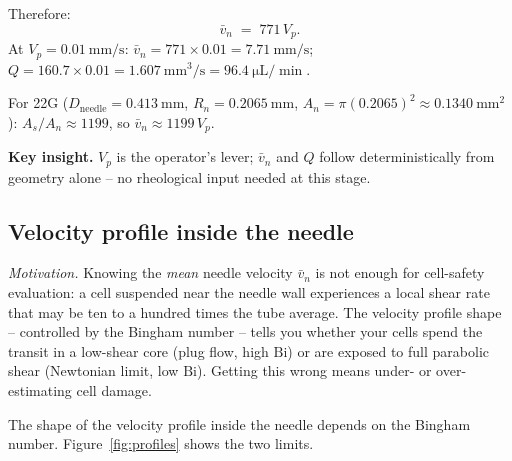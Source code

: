 \documentclass[11pt,a4paper]{article}
\newcommand{\Bi}{\mathrm{Bi}}
\begin{document}
\begin{derivationbox}[title={DERIVATION --- Mass balance: $V_p\to Q\to\bar v_n$}]
Therefore:
\begin{equation}
\bar v_n \;=\; 771\,V_p.
\label{eq:vbar_21G}
\end{equation}
At $V_p=\SI{0.01}{\mm/\s}$: $\bar v_n = 771\times 0.01 =
\SI{7.71}{\mm/\s}$; $Q=160.7\times 0.01=\SI{1.607}{\mm^3/\s}=
\SI{96.4}{\micro\liter/\min}$.

For 22G ($D_\mathrm{needle}=\SI{0.413}{\mm}$, $R_n=\SI{0.2065}{\mm}$,
$A_n=\pi(0.2065)^2\approx\SI{0.1340}{\mm^2}$):
$A_s/A_n\approx 1199$, so $\bar v_n\approx 1199\,V_p$.

\medskip\noindent\textbf{Key insight.} $V_p$ is the operator's lever; $\bar
v_n$ and $Q$ follow deterministically from geometry alone -- no
rheological input needed at this stage.
\end{derivationbox}

\subsection{Velocity profile inside the needle}
\label{sec:velocity_profile}

\emph{Motivation.}
Knowing the \emph{mean} needle velocity $\bar v_n$ is not enough for
cell-safety evaluation: a cell suspended near the needle wall experiences
a local shear rate that may be ten to a hundred times the tube average.
The velocity profile shape -- controlled by the Bingham number -- tells you
whether your cells spend the transit in a low-shear core (plug flow,
high $\Bi$) or are exposed to full parabolic shear (Newtonian limit, low
$\Bi$). Getting this wrong means under- or over-estimating cell damage.

The shape of the velocity profile inside the needle depends on the Bingham
number. Figure~\ref{fig:profiles} shows the two limits.
\end{document}
